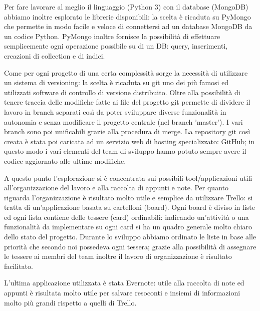 \documentclass[12pt]{report}
\begin{document}
Per fare lavorare al meglio il linguaggio (Python 3) con il database (MongoDB) abbiamo inoltre esplorato le librerie disponibili: la scelta è ricaduta su PyMongo che permette in modo facile e veloce di connettersi ad un database MongoDB da un codice Python. PyMongo inoltre fornisce la possibilità di effettuare semplicemente ogni operazione possibile su di un DB: query, inserimenti, creazioni di collection e di indici. 

\vspace{5mm} %
 
Come per ogni progetto di una certa complessità sorge la necessità di utilizzare un sistema di versioning: la scelta è ricaduta su git uno dei più famosi ed utilizzati software di controllo di versione distribuito. Oltre alla possibilità di tenere traccia delle modifiche fatte ai file del progetto git permette di dividere il lavoro in branch separati così da poter sviluppare diverse funzionalità in autonomia e senza modificare il progetto centrale (nel branch 'master'). I vari branch sono poi unificabili grazie alla procedura di merge. La repository git così creata è stata poi caricata ad un servizio web di hosting specializzato: GitHub; in questo modo i vari elementi del team di sviluppo hanno potuto sempre avere il codice aggiornato alle ultime modifiche.

\vspace{5mm} %

A questo punto l'esplorazione si è concentrata sui possibili tool/applicazioni utili all'organizzazione del lavoro e alla raccolta di appunti e note.
Per quanto riguarda l'organizzazione è risultato molto utile e semplice da utilizzare Trello: si tratta di un'applicazione basata su cartelloni (board). Ogni board è diviso in liste ed ogni lista contiene delle tessere (card) ordinabili: indicando un'attività o una funzionalità da implementare su ogni card si ha un quadro generale molto chiaro dello stato del progetto. Durante lo sviluppo abbiamo ordinato le liste in base alle priorità che secondo noi possedeva ogni tessera; grazie alla possibilità di assegnare le tessere ai membri del team inoltre il lavoro di organizzazione è risultato facilitato.

L'ultima applicazione utilizzata è stata Evernote: utile alla raccolta di note ed appunti è risultata molto utile per salvare resoconti e insiemi di informazioni molto più grandi rispetto a quelli di Trello. 

\vspace{5mm} %
\end{document}
